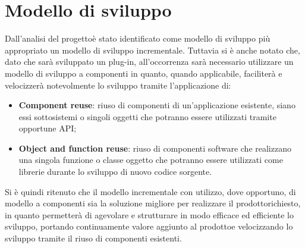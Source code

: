 \section{Modello di sviluppo}
Dall'analisi del progetto\glosp è stato identificato come modello di sviluppo più appropriato un modello di sviluppo incrementale. Tuttavia si è anche notato che, dato che sarà sviluppato un plug-in, all'occorrenza sarà necessario utilizzare un modello di sviluppo a componenti in quanto, quando applicabile, faciliterà e velocizzerà notevolmente lo sviluppo tramite l'applicazione di:
\begin{itemize}
	\item \textbf{Component reuse}: riuso di componenti di un'applicazione esistente, siano essi sottosistemi o singoli oggetti che potranno essere utilizzati tramite opportune API\glo;
	\item \textbf{Object and function reuse}: riuso di componenti software che realizzano una singola funzione o classe oggetto che potranno essere utilizzati come librerie durante lo sviluppo di nuovo codice sorgente.
\end{itemize}
Si è quindi ritenuto che il modello incrementale con utilizzo, dove opportuno, di modello a componenti sia la soluzione migliore per realizzare il prodotto\glosp richiesto, in quanto permetterà di agevolare e strutturare in modo efficace ed efficiente lo sviluppo, portando continuamente valore aggiunto al prodotto\glosp e velocizzando lo sviluppo tramite il riuso di componenti esistenti.

